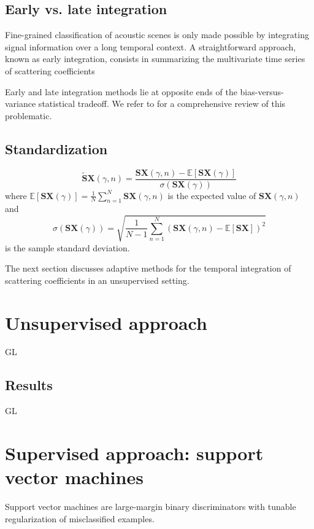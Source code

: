 \documentclass[journal]{IEEEtran}
\begin{document}
\subsection{Early vs. late integration}
Fine-grained classification of acoustic scenes is only made
possible by integrating signal information over a long temporal context.
A straightforward approach, known as early integration, consists in summarizing the multivariate time series of scattering coefficients

Early and late integration methods lie at opposite ends of the bias-versus-variance statistical tradeoff. We refer to \cite{Joder2009} for a comprehensive review of this problematic.

\subsection{Standardization}

\begin{equation}
\widetilde{\mathbf{S}}\boldsymbol{X}(\gamma, n) =
\dfrac{ \mathbf{S}\boldsymbol{X}(\gamma, n) -
\mathbb{E}[ \mathbf{S}\boldsymbol{X}(\gamma)]}{\sigma( \mathbf{S}\boldsymbol{X}(\gamma))}
\end{equation}
where $\mathbb{E}[ \mathbf{S}\boldsymbol{X}(\gamma)] = \frac{1}{N} \sum_{n=1}^{N} \mathbf{S}\boldsymbol{X}(\gamma,n)$ is the expected value of $\mathbf{S}\boldsymbol{X}(\gamma,n)$ and
\begin{equation}
\sigma(\mathbf{S}\boldsymbol{X} (\gamma)) =
\sqrt{\frac{1}{N-1} \sum_{n=1}^{N}
\left( \mathbf{S}\boldsymbol{X}(\gamma,n) - \mathbb{E}[\mathbf{S}\boldsymbol{X}] \right)^2}
\end{equation}
 is the sample standard deviation.
 
The next section discusses adaptive methods for the temporal integration of scattering coefficients in an unsupervised setting.

\section{Unsupervised approach}

GL

\subsection{Results}

GL

\section{Supervised approach: support vector machines}
Support vector machines are large-margin binary discriminators with tunable regularization of misclassified examples.
\end{document}
